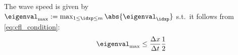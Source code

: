 \begin{defnbox}\nospacing
    \begin{defn}
        \label{defn:cfl_condition_system_of_cons_laws}
        The wave speed is given by $\eigenval_{\max}:=\max_{1\leq\idxp\leq m}\abs{\eigenval_{\idxp}}$ s.t.\ it follows from \cref{eq:cfl_condition}:
            \begin{align}
              \eigenval_{\max}\leq\frac{\Delta x}{\Delta t}\frac{1}{2}\label{eq:cfl_condition_systems_of_cons_laws}
            \end{align}
    \end{defn}
\end{defnbox}


